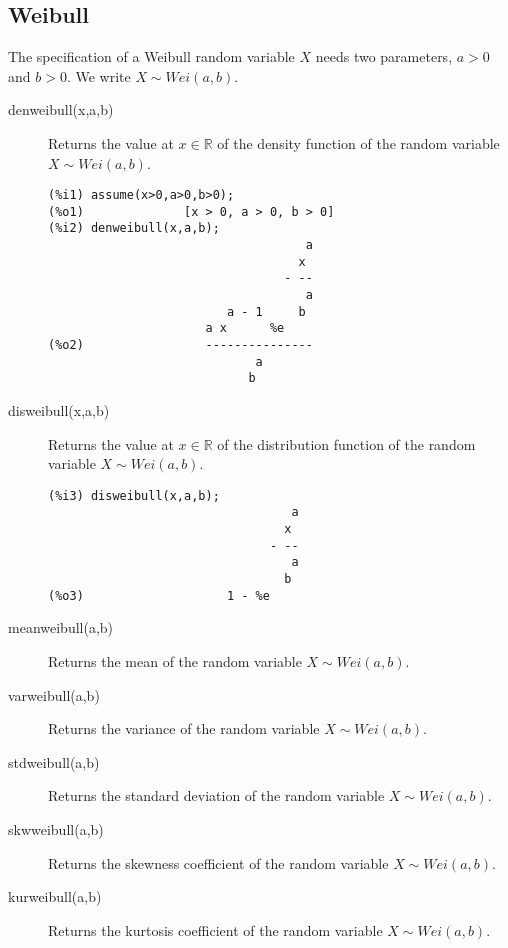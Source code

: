 \documentclass[12pt,a4paper]{article}
\newcommand{\R}{\mathbb{R}}
\begin{document}
\subsection{Weibull} \label{weibull}

The specification of a Weibull random variable $X$ needs two parameters, $a>0$ and $b>0$. We write $X \sim Wei(a,b)$.

\begin{description}

\item[denweibull(x,a,b)] Returns the value at $x \in \R$ of the density function of the random variable $X \sim Wei(a,b)$.

\begin{verbatim}
(%i1) assume(x>0,a>0,b>0);
(%o1)              [x > 0, a > 0, b > 0]
(%i2) denweibull(x,a,b);
                                    a
                                   x
                                 - --
                                    a
                         a - 1     b
                      a x      %e
(%o2)                 ---------------
                             a
                            b
\end{verbatim}

\item[disweibull(x,a,b)] Returns the value at $x \in \R$ of the distribution function of the random variable $X \sim Wei(a,b)$.

\begin{verbatim}
(%i3) disweibull(x,a,b);
                                  a
                                 x
                               - --
                                  a
                                 b
(%o3)                    1 - %e
\end{verbatim}

\item[meanweibull(a,b)] Returns the mean of the random variable  $X \sim Wei(a,b)$.

\item[varweibull(a,b)] Returns the variance of the random variable  $X \sim Wei(a,b)$.

\item[stdweibull(a,b)] Returns the standard deviation of the random variable  $X \sim Wei(a,b)$.

\item[skwweibull(a,b)] Returns the skewness coefficient of the random variable  $X \sim Wei(a,b)$.

\item[kurweibull(a,b)] Returns the kurtosis coefficient of the random variable  $X \sim Wei(a,b)$.


\end{description}
\end{document}
